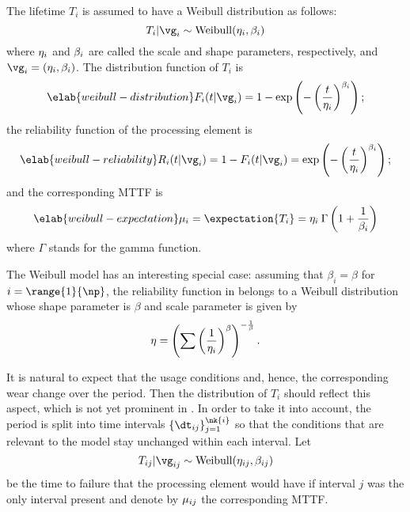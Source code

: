 The lifetime $T_i$ is assumed to have a Weibull distribution as follows:
\[
  T_i | \vg_i \sim \mathrm{Weibull}(\scale_i, \shape_i)
\]
where $\eta_i$ and $\beta_i$ are called the scale and shape parameters,
respectively, and $\vg_i = (\scale_i, \shape_i)$. The distribution function of
$T_i$ is
\begin{equation} \elab{weibull-distribution}
  F_i(t | \vg_i) = 1 - \exp\left(-\left(\frac{t}{\scale_i}\right)^{\shape_i}\right);
\end{equation}
the reliability function of the processing element is
\begin{equation} \elab{weibull-reliability}
  R_i(t | \vg_i) = 1 - F_i(t | \vg_i) = \exp\left(-\left(\frac{t}{\scale_i}\right)^{\shape_i}\right);
\end{equation}
and the corresponding \ac{MTTF} is
\begin{equation} \elab{weibull-expectation}
  \mean_i = \expectation{T_i} = \scale_i \: \Gamma\left(1 + \frac{1}{\shape_i}\right)
\end{equation}
where $\Gamma$ stands for the gamma function.

\begin{remark} 
The Weibull model has an interesting special case: assuming that $\beta_i =
\beta$ for $i = \range{1}{\np}$, the reliability function in
 belongs to a Weibull distribution whose shape parameter
is $\beta$ and scale parameter is given by
\[
  \eta = \left(\sum\left(\frac{1}{\eta_i}\right)^\beta\right)^{-\frac{1}{\beta}}.
\]
\end{remark}

It is natural to expect that the usage conditions and, hence, the corresponding
wear change over the period. Then the distribution of $T_i$ should reflect this
aspect, which is not yet prominent in . In order to
take it into account, the period is split into  time intervals $\{
\dt_{ij} \}_{j = 1}^{\nk{i}}$ so that the conditions that are relevant to the
model stay unchanged within each interval. Let
\[
  T_{ij} | \vg_{ij} \sim \mathrm{Weibull}(\scale_{ij}, \shape_{ij})
\]
be the time to failure that the processing element would have if interval $j$
was the only interval present and denote by $\mu_{ij}$ the corresponding
\ac{MTTF}.

